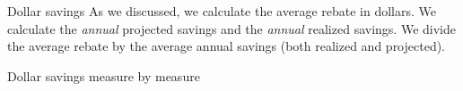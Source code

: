 \documentclass[8pt]{beamer}
\begin{document}
\begin{frame}{Dollar savings}
	As we discussed, we calculate the average rebate in dollars. We calculate the \textit{annual} projected savings and the \textit{annual} realized savings. We divide the average rebate by the average annual savings (both realized and projected).	
	\tiny
	
\end{frame}

\begin{frame}{Dollar savings measure by measure}
	\tiny
	
\end{frame}
\end{document}

